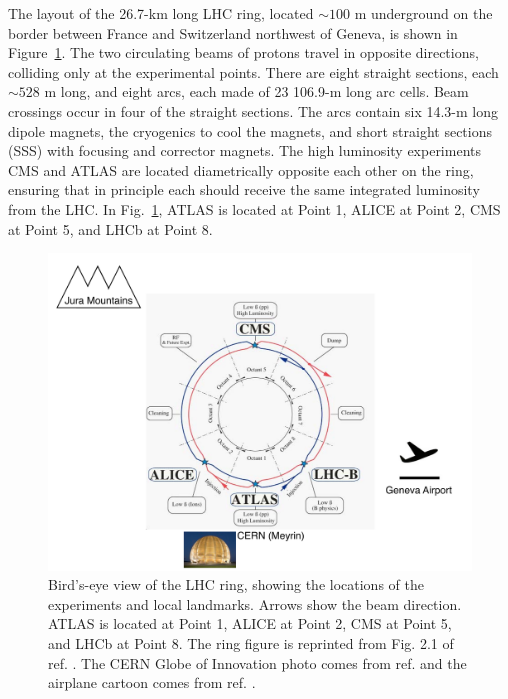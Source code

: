 \documentclass[dissertation.tex]{subfiles}
\begin{document}
The layout of the 26.7-km long \cite{LHC_public} LHC ring, located $\sim100$ m underground on the border between France and Switzerland northwest of Geneva, is shown in Figure~\ref{fig:LHC_layout}.  The two circulating beams of protons travel in opposite directions, colliding only at the experimental points.  There are eight straight sections, each $\sim528$ m long, and eight arcs, each made of 23 106.9-m long arc cells.  Beam crossings occur in four of the straight sections.  The arcs contain six 14.3-m long dipole magnets, the cryogenics to cool the magnets, and short straight sections (SSS) with focusing and corrector magnets.  The high luminosity experiments CMS and ATLAS are located diametrically opposite each other on the ring, ensuring that in principle each should receive the same integrated luminosity from the LHC.  In Fig.~\ref{fig:LHC_layout}, ATLAS is located at Point 1, ALICE at Point 2, CMS at Point 5, and LHCb at Point 8.

\begin{figure}
	\centering
	\includegraphics[scale=0.4]{LHC_layout}
	\caption{Bird's-eye view of the LHC ring, showing the locations of the experiments and local landmarks.  Arrows show the beam direction.  ATLAS is located at Point 1, ALICE at Point 2, CMS at Point 5, and LHCb at Point 8.  The ring figure is reprinted from Fig. 2.1 of ref. \cite{1748-0221-3-08-S08001}.  The CERN Globe of Innovation photo comes from ref. \cite{CERN_Globe} and the airplane cartoon comes from ref. \cite{airplane}.}
	\label{fig:LHC_layout}
\end{figure}
\end{document}
